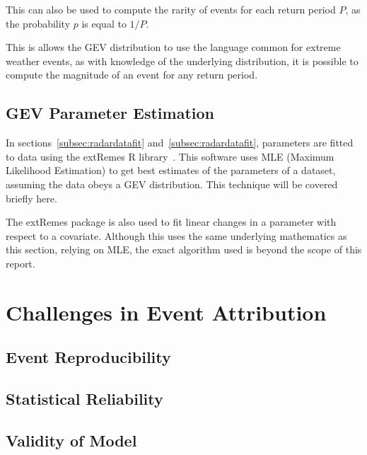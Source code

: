 This can also be used to compute the rarity of events for each return period $P$,
    as the probability $p$ is equal to $1/P$.

This is allows the GEV distribution to use the language common for extreme weather events,
    as with knowledge of the underlying distribution,
    it is possible to compute the magnitude of an event for any return period.

\subsection{GEV Parameter Estimation}\label{subsec:parameterest}

In sections~\ref{subsec:radardatafit} and~\ref{subsec:radardatafit},
    parameters are fitted to data using the extRemes R library~\cite{extremes_R}.
This software uses MLE (Maximum Likelihood Estimation) to get best estimates of the parameters of a dataset,
    assuming the data obeys a GEV distribution.
This technique will be covered briefly here.

The extRemes package is also used to fit linear changes in a parameter with respect to a covariate.
Although this uses the same underlying mathematics as this section,
    relying on MLE,
    the exact algorithm used is beyond the scope of this report.

\subsubsection{}

\section{Challenges in Event Attribution}\label{sec:attrchallenge}

\subsection{Event Reproducibility}\label{subsec:eventrepro}

\subsection{Statistical Reliability}\label{subsec:statvalid}

\subsection{Validity of Model}\label{subsec:modelvalid}